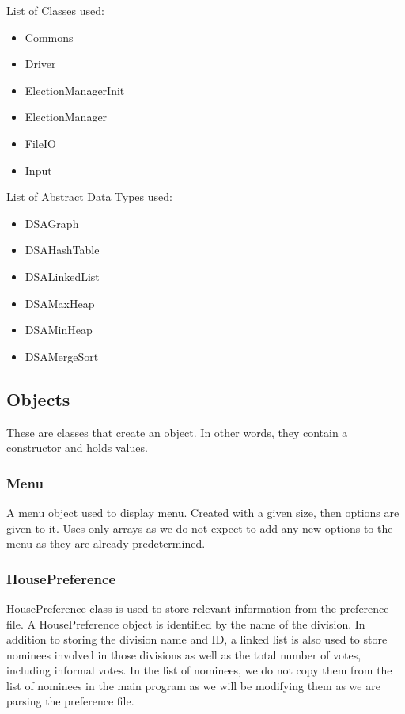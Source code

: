 \documentclass[a4paper, 12pt, titlepage]{article}
\begin{document}
List of Classes used:
\begin{itemize}[label={--}]
    \item Commons
    \item Driver
    \item ElectionManagerInit
    \item ElectionManager
    \item FileIO
    \item Input
\end{itemize}

List of Abstract Data Types used:
\begin{itemize}[label={--}]
    \item DSAGraph
    \item DSAHashTable
    \item DSALinkedList
    \item DSAMaxHeap
    \item DSAMinHeap
    \item DSAMergeSort
\end{itemize}
\newpage

\subsection{Objects}

These are classes that create an object. In other words, they contain a
constructor and holds values.

\subsubsection{Menu}

A menu object used to display menu. Created with a given size, then
options are given to it. Uses only arrays as we do not expect to add
any new options to the menu as they are already predetermined.

\subsubsection{HousePreference}

HousePreference class is used to store relevant information from the
preference file. A HousePreference object is identified by the name
of the division. In addition to storing the division name and ID,
a linked list is also used to store nominees involved in those divisions
as well as the total number of votes, including informal votes. In the list
of nominees, we do not copy them from the list of nominees in the main program
as we will be modifying them as we are parsing the preference file.
\end{document}
